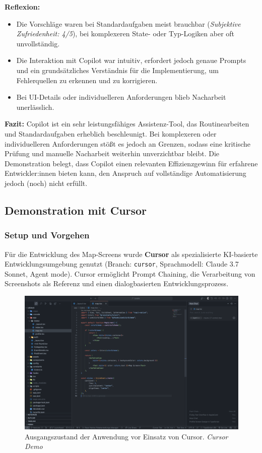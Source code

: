 \textbf{Reflexion:}
\begin{itemize}
      \item Die Vorschläge waren bei Standardaufgaben meist brauchbar (\textit{Subjektive
                  Zufriedenheit: 4/5}), bei komplexeren State- oder Typ-Logiken aber oft
            unvollständig.
      \item Die Interaktion mit Copilot war intuitiv, erfordert jedoch genaue Prompts und
            ein grundsätzliches Verständnis für die Implementierung, um Fehlerquellen zu
            erkennen und zu korrigieren.
      \item Bei UI-Details oder individuelleren Anforderungen blieb Nacharbeit
            unerlässlich.
\end{itemize}

\textbf{Fazit:}
Copilot ist ein sehr leistungsfähiges Assistenz-Tool, das Routinearbeiten und Standardaufgaben erheblich beschleunigt. Bei komplexeren oder individuelleren Anforderungen stößt es jedoch an Grenzen, sodass eine kritische Prüfung und manuelle Nacharbeit weiterhin unverzichtbar bleibt. Die Demonstration belegt, dass Copilot einen relevanten Effizienzgewinn für erfahrene Entwickler:innen bieten kann, den Anspruch auf vollständige Automatisierung jedoch (noch) nicht erfüllt.

\subsection{Demonstration mit Cursor}

\subsubsection{Setup und Vorgehen}
Für die Entwicklung des Map-Screens wurde \textbf{Cursor} als spezialisierte
KI-basierte Entwicklungsumgebung genutzt (Branch: \texttt{cursor},
Sprachmodell: Claude 3.7 Sonnet, Agent mode). Cursor ermöglicht Prompt
Chaining, die Verarbeitung von Screenshots als Referenz und einen
dialogbasierten Entwicklungsprozess.

\begin{figure}[htbp]
      \centering
      \includegraphics[width=1\textwidth]{images/cursor_screenshots/Screenshots Ist-Zustand-cursor.png}
      \caption{Ausgangszustand der Anwendung vor Einsatz von Cursor. \textit{Cursor Demo}}
      \label{fig:cursor-istzustand}
\end{figure}

